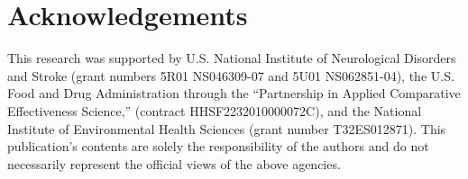 \documentclass[article]{jss}
\begin{document}
\section*{Acknowledgements}
\label{sec:acknowledgements}
This research was supported by U.S. National Institute of Neurological Disorders and Stroke (grant numbers 5R01 NS046309-07 and 5U01 NS062851-04), the U.S. Food and Drug Administration through the ``Partnership in Applied Comparative Effectiveness Science,'' (contract HHSF2232010000072C), and the National Institute of Environmental Health Sciences (grant number T32ES012871). This publication's contents are solely the responsibility of the authors and do not necessarily represent the official views of the above agencies.



 
\end{document}
